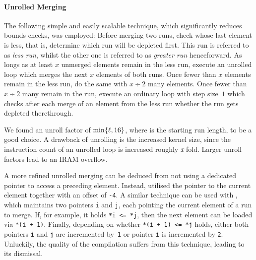 \paragraph{Unrolled Merging}
The following simple and easily scalable technique, which significantly reduces bounds checks, was employed:
Before merging two runs, check whose last element is less, that is, determine which run will be depleted first.
This run is referred to as \emph{less run}, whilst the other one is referred to as \emph{greater run} henceforward.
As longs as at least \(x\) unmerged elements remain in the less run, execute an unrolled loop which merges the next \(x\) elements of both runs.
Once fewer than \(x\) elements remain in the less run, do the same with \(x \div 2\) many elements.
Once fewer than \(x \div 2\) many remain in the run, execute an ordinary loop with step size~\(1\) which checks after each merge of an element from the less run whether the run gets depleted therethrough.

We found an unroll factor of \(\min\{ \ell, 16 \}\), where \startingrun{} is the starting run length, to be a good choice.
A drawback of unrolling is the increased kernel size, since the instruction count of an unrolled loop is increased roughly \(x\kern .125em\)fold.
Larger unroll factors lead to an \ac{IRAM} overflow.

A more refined unrolled merging can be deduced from \IS{} not using a dedicated pointer to access a preceding element.
Instead, \IS{} utilised the pointer to the current element together with an offset of \lstinline|-4|.
A similar technique can be used with \MS{}, which maintains two pointers \lstinline|i| and \lstinline|j|, each pointing the current element of a run to merge.
If, for example, it holds \lstinline|*i <= *j|, then the next element can be loaded via \lstinline|*(i + 1)|.
Finally, depending on whether \lstinline|*(i + 1) <= *j| holds, either both pointers \lstinline|i| and \lstinline|j| are incremented by~\lstinline|1| or pointer \lstinline|i| is incremented by \lstinline|2|.
Unluckily, the quality of the compilation suffers from this technique, leading to its dismissal.
